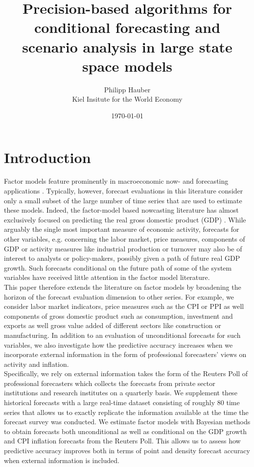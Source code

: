 \documentclass[notitlepage,a4paper,12pt]{article}
\begin{document}
\title{Precision-based algorithms for conditional forecasting and scenario analysis in large state space models}

\author{
  Philipp Hauber\\
  Kiel Insitute for the World Economy
}
\date{\today}

\maketitle

\section{Introduction}

Factor models feature prominently in macroeconomic now- and forecasting applications \citep[e.g][]{stockwatson_2002}. Typically, however, forecast evaluations in this literature consider only a small subset of the large number of time series that are used to estimate these models. Indeed, the factor-model based nowcasting literature has almost exclusively focused on predicting the real gross domestic product (GDP) \citep[see][]{grs_2008, bok_etal_2018, breitungschumacher_2008, kms_jae_2013}. While arguably the single most important measure of economic activity, forecasts for other variables, e.g. concerning the labor market, price measures, components of GDP or activity measures like industrial production or turnover may also be of interest to analysts or policy-makers, possibly given a path of future real GDP growth. Such forecasts conditional on the future path of some of the system variables have received little attention in the factor model literature.\\

This paper therefore extends the literature on factor models by broadening the horizon of the forecast evaluation dimension to other series. For example, we consider labor market indicators, price measures such as the CPI or PPI as well components of gross domestic product such as consumption, investment and exports as well gross value added of different sectors like construction or manufacturing. In addition to an evaluation of unconditional forecasts for such variables, we also investigate how the predictive accuracy increases when we incorporate external information in the form of professional forecasters' views on activity and inflation. \\

Specifically, we rely on external information takes the form of the Reuters Poll of professional forecasters which collects the forecasts from private sector institutions and research institutes on a quarterly basis. We supplement these historical forecasts with a large real-time dataset consisting of roughly 80 time series that allows us to exactly replicate the information available at the time the forecast survey was conducted. We estimate factor models with Bayesian methods to obtain forecasts both unconditional as well as conditional on the GDP growth and CPI inflation forecasts from the Reuters Poll. This allows us to assess how predictive accuracy improves both in terms of point and density forecast accuracy when external information is included.\\
\end{document}
